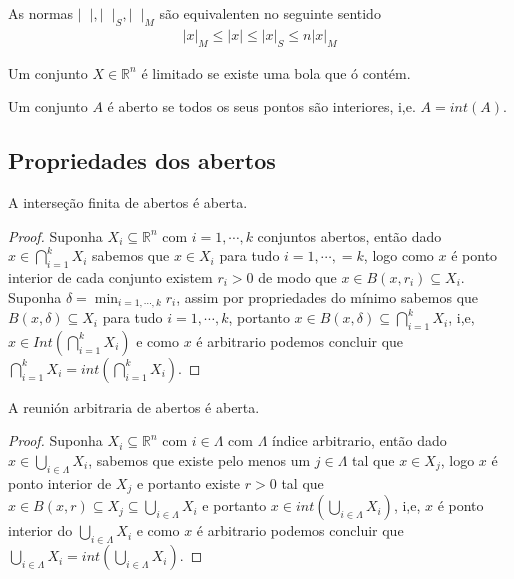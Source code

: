 \begin{note}
  As normas $|\phantom{x}|,|\phantom{x}|_{S},|\phantom{x}|_{M}$ são equivalenten no seguinte sentido
  \begin{align*}
    |x|_{M}\leq|x|\leq|x|_{S}\leq n|x|_{M}
  \end{align*}
\end{note}
\begin{definition}
  Um conjunto $X\in\mathbb{R}^{n}$ é limitado se existe uma bola que ó contém. 
\end{definition}
\begin{definition}
  Um conjunto $A$ é aberto se todos os seus pontos são interiores, i,e. $A=int(A)$. 
\end{definition}
\subsection{Propriedades dos abertos}
\begin{theorem}
  A interseção finita de abertos é aberta.
\end{theorem}
\begin{proof} 
  Suponha $X_i\subseteq \mathbb{R}^{n}$ com $i=1,\cdots,k$ conjuntos abertos, então dado $x\in \bigcap_{i=1}^{k}X_i$ sabemos que $x\in X_i$ para tudo $i=1,\cdots,=k$, logo como $x$ é ponto interior de cada conjunto existem $r_i>0$ de modo que $x\in B(x,r_i)\subseteq X_i$.\\
  Suponha $\displaystyle \delta=\min_{i=1,\cdots,k} r_i$, assim por propriedades do mínimo sabemos que $B(x,\delta)\subseteq X_i$ para tudo $i=1,\cdots,k$, portanto $x\in B(x,\delta)\subseteq \bigcap_{i=1}^{k}X_i$, i,e, $x\in Int\left( \bigcap_{i=1}^{k}X_i \right)$ e como $x$ é arbitrario podemos concluir que $\bigcap_{i=1}^{k}X_i=int\left( \bigcap_{i=1}^{k}X_i \right)$.
\end{proof}
\begin{theorem}
  A reunión arbitraria de abertos é aberta.
\end{theorem}
\begin{proof} 
  Suponha $X_i\subseteq \mathbb{R}^{n}$ com $i\in \Lambda$ com $\Lambda$ índice arbitrario, então dado $x\in \bigcup_{i\in\Lambda}X_i$, sabemos que existe pelo menos um $j\in\Lambda$ tal que $x\in X_j$, logo $x$ é ponto interior de $X_j$ e portanto existe $r>0$ tal que $x\in B(x,r)\subseteq X_j \subseteq \bigcup_{i\in\Lambda}X_i$ e portanto $x\in int\left( \bigcup_{i\in\Lambda}X_i \right)$, i,e, $x$ é ponto interior do $\bigcup_{i\in\Lambda}X_i$ e como $x$ é arbitrario podemos concluir que $\bigcup_{i\in\Lambda}X_i=int\left( \bigcup_{i\in\Lambda}X_i \right)$. 
\end{proof}
